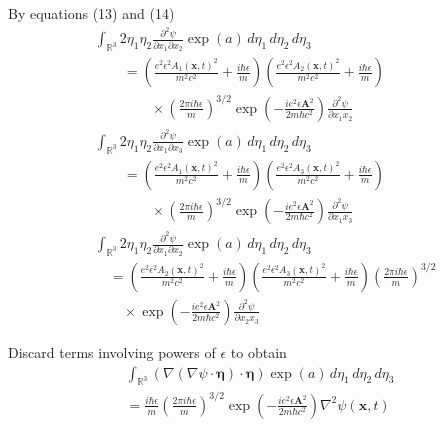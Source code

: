 \documentclass[12pt]{article}
\begin{document}
By equations (13) and (14)
\begin{align*}
&\int_{\mathbb R^3}
2\eta_1\eta_2\frac{\partial^2\psi}{\partial x_1\partial x_2}
\exp(a)\,d\eta_1\,d\eta_2\,d\eta_3
\\
&\qquad{}=
\left(\frac{e^2\epsilon^2 A_1(\mathbf x,t)^2}{m^2c^2}+\frac{i\hbar\epsilon}{m}\right)
\left(\frac{e^2\epsilon^2 A_2(\mathbf x,t)^2}{m^2c^2}+\frac{i\hbar\epsilon}{m}\right)
\\
&\qquad\qquad{}\times
\left(\frac{2\pi i\hbar\epsilon}{m}\right)^{3/2}
\exp\left(-\frac{ie^2\epsilon\mathbf A^2}{2m\hbar c^2}\right)
\frac{\partial^2\psi}{\partial x_1 x_2}
\\
&\int_{\mathbb R^3}
2\eta_1\eta_2\frac{\partial^2\psi}{\partial x_1\partial x_3}
\exp(a)\,d\eta_1\,d\eta_2\,d\eta_3
\\
&\qquad{}=
\left(\frac{e^2\epsilon^2 A_1(\mathbf x,t)^2}{m^2c^2}+\frac{i\hbar\epsilon}{m}\right)
\left(\frac{e^2\epsilon^2 A_3(\mathbf x,t)^2}{m^2c^2}+\frac{i\hbar\epsilon}{m}\right)
\\
&\qquad\qquad{}\times
\left(\frac{2\pi i\hbar\epsilon}{m}\right)^{3/2}
\exp\left(-\frac{ie^2\epsilon\mathbf A^2}{2m\hbar c^2}\right)
\frac{\partial^2\psi}{\partial x_1 x_3}
\\
&\int_{\mathbb R^3}
2\eta_1\eta_2\frac{\partial^2\psi}{\partial x_1\partial x_2}
\exp(a)\,d\eta_1\,d\eta_2\,d\eta_3
\\
&\quad{}=
\left(\frac{e^2\epsilon^2 A_2(\mathbf x,t)^2}{m^2c^2}+\frac{i\hbar\epsilon}{m}\right)
\left(\frac{e^2\epsilon^2 A_3(\mathbf x,t)^2}{m^2c^2}+\frac{i\hbar\epsilon}{m}\right)
\left(\frac{2\pi i\hbar\epsilon}{m}\right)^{3/2}
\\
&\qquad{}\times
\exp\left(-\frac{ie^2\epsilon\mathbf A^2}{2m\hbar c^2}\right)
\frac{\partial^2\psi}{\partial x_2 x_3}
\end{align*}

Discard terms involving powers of $\epsilon$ to obtain
\begin{multline*}
\int_{\mathbb R^3}
(\nabla(\nabla\psi\cdot\boldsymbol\eta)\cdot\boldsymbol\eta)
\exp(a)\,d\eta_1\,d\eta_2\,d\eta_3
\\
{}=\frac{i\hbar\epsilon}{m}\left(\frac{2\pi i\hbar\epsilon}{m}\right)^{3/2}
\exp\left(-\frac{ie^2\epsilon\mathbf A^2}{2m\hbar c^2}\right)
\nabla^2\psi(\mathbf x,t)
\tag{18}
\end{multline*}
\end{document}
